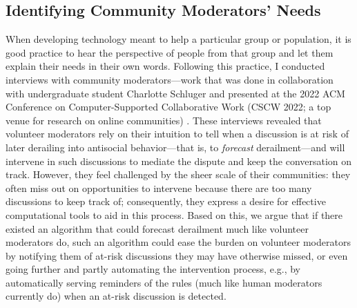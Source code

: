 \documentclass[11pt,letterpaper]{article}
\begin{document}
\subsection{Identifying Community Moderators' Needs}
When developing technology meant to help a particular group or population, it is good practice to hear the perspective of people from that group and let them explain their needs in their own words.
Following this practice, I conducted interviews with community moderators---work that was done in collaboration with undergraduate student Charlotte Schluger and presented at the 2022 ACM Conference on Computer-Supported Collaborative Work (CSCW 2022; a top venue for research on online communities) \cite{schluger_proactive_2022}.
These interviews revealed that volunteer moderators rely on their intuition to tell when a discussion is at risk of later derailing into antisocial behavior---that is, to \emph{forecast} derailment---and will intervene in such discussions to mediate the dispute and keep the conversation on track.
However, they feel challenged by the sheer scale of their communities: they often miss out on opportunities to intervene because there are too many discussions to keep track of; consequently, they express a desire for effective computational tools to aid in this process.
Based on this, we argue that if there existed an algorithm that could forecast derailment much like volunteer moderators do, such an algorithm could ease the burden on volunteer moderators by notifying them of at-risk discussions they may have otherwise missed, or even going further and partly automating the intervention process, e.g., by automatically serving reminders of the rules (much like human moderators currently do) when an at-risk discussion is detected.
\end{document}

